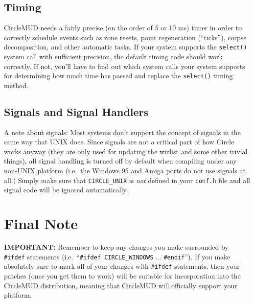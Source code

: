 \documentclass[11pt]{article}
\begin{document}
\subsection{Timing}
CircleMUD needs a fairly precise (on the order of 5 or 10 ms) timer in order to correctly schedule events such as zone resets, point regeneration (``ticks''), corpse decomposition, and other automatic tasks.  If your system supports the \texttt{select()} system call with sufficient precision, the default timing code should work correctly.  If not, you'll have to find out which system calls your system supports for determining how much time has passed and replace the \texttt{select()} timing method.

\subsection{Signals and Signal Handlers}
A note about signals: Most systems don't support the concept of signals in the same way that UNIX does.  Since signals are not a critical part of how Circle works anyway (they are only used for updating the wizlist and some other trivial things), all signal handling is turned off by default when compiling under any non-UNIX platform (i.e.\ the Windows 95 and Amiga ports do not use signals at all.)  Simply make sure that \texttt{CIRCLE\_UNIX} is {\em not} defined in your \texttt{conf.h} file and all signal code will be ignored automatically.

\section{Final Note}
{\bf IMPORTANT:} Remember to keep any changes you make surrounded by \texttt{\#ifdef} statements (i.e.\ ``\texttt{\#ifdef CIRCLE\_WINDOWS} ... \texttt{\#endif}'').  If you make absolutely sure to mark all of your changes with \texttt{\#ifdef} statements, then your patches (once you get them to work) will be suitable for incorporation into the CircleMUD distribution, meaning that CircleMUD will officially support your platform.
\end{document}
